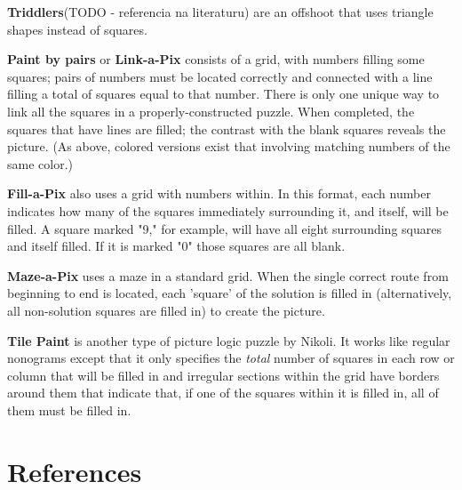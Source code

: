 \textbf{Triddlers}(TODO - referencia na literaturu) are an offshoot that uses triangle shapes instead of squares.

\textbf{Paint by pairs} or \textbf{Link-a-Pix} consists of a grid, with numbers filling some squares; pairs of numbers must be located correctly and connected with a line filling a total of squares equal to that number.  There is only one unique way to link all the squares in a properly-constructed puzzle.  When completed, the squares that have lines are filled; the contrast with the blank squares reveals the picture. (As above, colored versions exist that involving matching numbers of the same color.)

\textbf{Fill-a-Pix} also uses a grid with numbers within. In this format, each number indicates how many of the squares immediately surrounding it, and itself, will be filled. A square marked "9," for example, will have all eight surrounding squares and itself filled. If it is marked "0" those squares are all blank.

\textbf{Maze-a-Pix} uses a maze in a standard grid.  When the single correct route from beginning to end is located, each 'square' of the solution is filled in (alternatively, all non-solution squares are filled in) to create the picture.

\textbf{Tile Paint} is another type of picture logic puzzle by Nikoli. It works like regular nonograms except that it only specifies the \textit{total} number of squares in each row or column that will be filled in and irregular sections within the grid have borders around them that indicate that, if one of the squares within it is filled in, all of them must be filled in.


\chapter{References}


